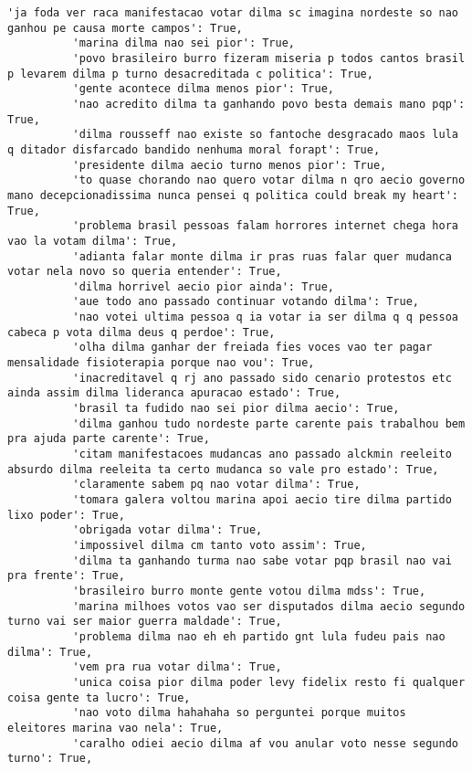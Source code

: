 \documentclass[11pt]{article}
\begin{document}
\begin{Verbatim}[commandchars=\\\{\}]
          'ja foda ver raca manifestacao votar dilma sc imagina nordeste so nao ganhou pe causa morte campos': True,
          'marina dilma nao sei pior': True,
          'povo brasileiro burro fizeram miseria p todos cantos brasil p levarem dilma p turno desacreditada c politica': True,
          'gente acontece dilma menos pior': True,
          'nao acredito dilma ta ganhando povo besta demais mano pqp': True,
          'dilma rousseff nao existe so fantoche desgracado maos lula q ditador disfarcado bandido nenhuma moral forapt': True,
          'presidente dilma aecio turno menos pior': True,
          'to quase chorando nao quero votar dilma n qro aecio governo mano decepcionadissima nunca pensei q politica could break my heart': True,
          'problema brasil pessoas falam horrores internet chega hora vao la votam dilma': True,
          'adianta falar monte dilma ir pras ruas falar quer mudanca votar nela novo so queria entender': True,
          'dilma horrivel aecio pior ainda': True,
          'aue todo ano passado continuar votando dilma': True,
          'nao votei ultima pessoa q ia votar ia ser dilma q q pessoa cabeca p vota dilma deus q perdoe': True,
          'olha dilma ganhar der freiada fies voces vao ter pagar mensalidade fisioterapia porque nao vou': True,
          'inacreditavel q rj ano passado sido cenario protestos etc ainda assim dilma lideranca apuracao estado': True,
          'brasil ta fudido nao sei pior dilma aecio': True,
          'dilma ganhou tudo nordeste parte carente pais trabalhou bem pra ajuda parte carente': True,
          'citam manifestacoes mudancas ano passado alckmin reeleito absurdo dilma reeleita ta certo mudanca so vale pro estado': True,
          'claramente sabem pq nao votar dilma': True,
          'tomara galera voltou marina apoi aecio tire dilma partido lixo poder': True,
          'obrigada votar dilma': True,
          'impossivel dilma cm tanto voto assim': True,
          'dilma ta ganhando turma nao sabe votar pqp brasil nao vai pra frente': True,
          'brasileiro burro monte gente votou dilma mdss': True,
          'marina milhoes votos vao ser disputados dilma aecio segundo turno vai ser maior guerra maldade': True,
          'problema dilma nao eh eh partido gnt lula fudeu pais nao dilma': True,
          'vem pra rua votar dilma': True,
          'unica coisa pior dilma poder levy fidelix resto fi qualquer coisa gente ta lucro': True,
          'nao voto dilma hahahaha so perguntei porque muitos eleitores marina vao nela': True,
          'caralho odiei aecio dilma af vou anular voto nesse segundo turno': True,

\end{Verbatim}
\end{document}

